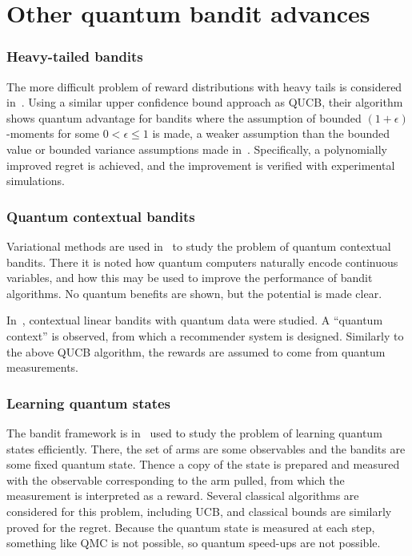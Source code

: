 \section{Other quantum bandit advances}
\label{sec:qbandits_other}

\subsubsection{Heavy-tailed bandits}
The more difficult problem of reward distributions with heavy tails is considered in~\autocite{wu2023}.
Using a similar upper confidence bound approach as QUCB, their algorithm shows quantum advantage for bandits where the assumption of bounded $(1 + \epsilon)$-moments for some $0<\epsilon \leq 1$ is made, a weaker assumption than the bounded value or bounded variance assumptions made in~\autocite{wan2022}.
Specifically, a polynomially improved regret is achieved, and the improvement is verified with experimental simulations.

\subsubsection{Quantum contextual bandits}
Variational methods are used in~\autocite{hu2019} to study the problem of quantum contextual bandits.
There it is noted how quantum computers naturally encode continuous variables, and how this may be used to improve the performance of bandit algorithms.
No quantum benefits are shown, but the potential is made clear.

In~\autocite{brahmachari2023}, contextual linear bandits with quantum data were studied.
A \enquote{quantum context} is observed, from which a recommender system is designed.
Similarly to the above QUCB algorithm, the rewards are assumed to come from quantum measurements.


\subsubsection{Learning quantum states}
The bandit framework is in~\autocite{lumbreras2022} used to study the problem of learning quantum states efficiently.
There, the set of arms are some observables and the bandits are some fixed quantum state.
Thence a copy of the state is prepared and measured with the observable corresponding to the arm pulled, from which the measurement is interpreted as a reward.
Several classical algorithms are considered for this problem, including UCB, and classical bounds are similarly proved for the regret.
Because the quantum state is measured at each step, something like QMC is not possible, so quantum speed-ups are not possible.



